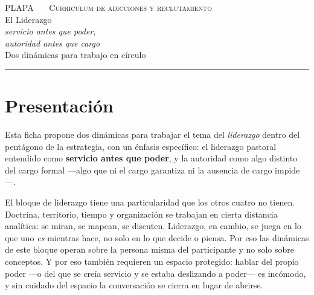 \documentclass[11pt, a4paper]{article}
\begin{document}

\thispagestyle{plain}
\begin{center}
  \vspace*{1.5em}
  {\color{tenue}\scshape\small PLAPA \ \textbullet\ \ Curriculum de adicciones y reclutamiento}\\
  \vspace{2em}
  {\color{liderazgoVino}\Huge El Liderazgo}\\[0.35em]
  {\color{tinte}\LARGE\itshape servicio antes que poder,}\\[0.15em]
  {\color{tinte}\LARGE\itshape autoridad antes que cargo}\\
  \vspace{1.4em}
  {\color{tenue}\large Dos dinámicas para trabajo en círculo}\\
  \vspace{0.6em}
  {\color{regla}\rule{0.35\linewidth}{0.5pt}}
\end{center}

\vspace{2em}

\section*{Presentación}

Esta ficha propone dos dinámicas para trabajar el tema del \emph{liderazgo} dentro del pentágono de la estrategia, con un énfasis específico: el liderazgo pastoral entendido como \textbf{servicio antes que poder}, y la autoridad como algo distinto del cargo formal ---algo que ni el cargo garantiza ni la ausencia de cargo impide---.

El bloque de liderazgo tiene una particularidad que los otros cuatro no tienen. Doctrina, territorio, tiempo y organización se trabajan en cierta distancia analítica: se miran, se mapean, se discuten. Liderazgo, en cambio, se juega en lo que uno \emph{es} mientras hace, no solo en lo que decide o piensa. Por eso las dinámicas de este bloque operan sobre la persona misma del participante y no solo sobre conceptos. Y por eso también requieren un espacio protegido: hablar del propio poder ---o del que se creía servicio y se estaba deslizando a poder--- es incómodo, y sin cuidado del espacio la conversación se cierra en lugar de abrirse.
\end{document}
